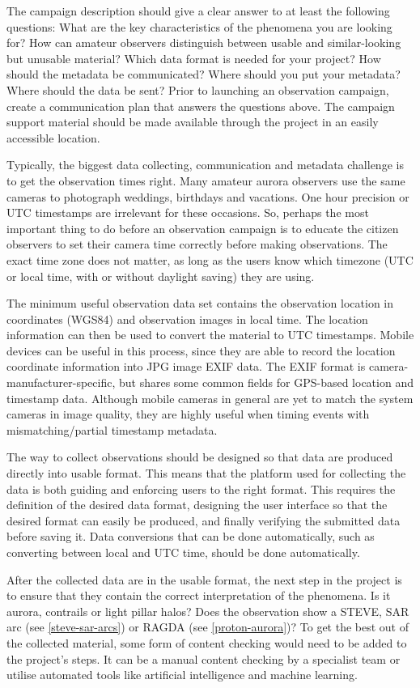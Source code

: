 \documentclass{article}
\begin{document}
The campaign description should give a clear answer to at least the following questions: What are the key characteristics of the phenomena you are looking for? How can amateur observers distinguish between usable and similar-looking but unusable material? Which data format is needed for your project? How should the metadata be communicated? Where should you put your metadata? Where should the data be sent? Prior to launching an observation campaign, create a communication plan that answers the questions above. The campaign support material should be made available through the project in an easily accessible location.

Typically, the biggest data collecting, communication and metadata challenge is to get the observation times right. Many amateur aurora observers use the same cameras to photograph weddings, birthdays and vacations. One hour precision or UTC timestamps are irrelevant for these occasions. So, perhaps the most important thing to do before an observation campaign is to educate the citizen observers to set their camera time correctly before making observations. The exact time zone does not matter, as long as the users know which timezone (UTC or local time, with or without daylight saving) they are using.

The minimum useful observation data set contains the observation location in coordinates (WGS84) and observation images in local time. The location information can then be used to convert the material to UTC timestamps. 
Mobile devices can be useful in this process, since they are able to record the location coordinate information into JPG image EXIF data. The EXIF format is camera-manufacturer-specific, but shares some common fields for GPS-based location and timestamp data. Although mobile cameras in general are yet to match the system cameras in image quality, they are highly useful when timing events with mismatching/partial timestamp metadata.

The way to collect observations should be designed so that data are produced directly into usable format. This means that the platform used for collecting the data is both guiding and enforcing users to the right format. This requires the definition of the desired data format, designing the user interface so that the desired format can easily be produced, and finally verifying the submitted data before saving it. Data conversions that can be done automatically, such as converting between local and UTC time, should be done automatically.

After the collected data are in the usable format, the next step in the project is to ensure that they contain the correct interpretation of the phenomena. Is it aurora, contrails or light pillar halos? Does the observation show a STEVE, SAR arc (see \ref{steve-sar-arcs}) or RAGDA (see \ref{proton-aurora})? To get the best out of the collected material, some form of content checking would need to be added to the project's steps. It can be a manual content checking by a specialist team or utilise automated tools like artificial intelligence and machine learning.
\end{document}
